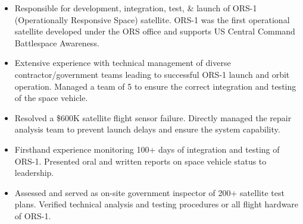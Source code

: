 \begin{itemize}
\begin{itemize}
    \item Responsible for development, integration, test, \& launch of ORS-1 (Operationally Responsive Space) satellite.
     ORS-1 was the first operational satellite developed under the ORS office and supports US Central Command Battlespace Awareness.
    \item Extensive experience with technical management of diverse contractor/government teams leading to successful ORS-1 launch and orbit operation.
    Managed a team of 5 to ensure the correct integration and testing of the space vehicle.
    \item Resolved a \$600K satellite flight sensor failure.
    Directly managed the repair analysis team to prevent launch delays and ensure the system capability.
    \item Firsthand experience monitoring 100+ days of integration and testing of ORS-1.
        Presented oral and written reports on space vehicle status to leadership.
    \item Assessed and served as on-site government inspector of 200+ satellite test plans.
     Verified technical analysis and testing procedures or all flight hardware of ORS-1. 
\end{itemize}

\end{itemize} %
